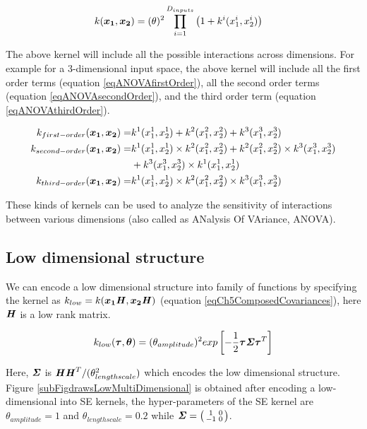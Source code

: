 \begin{align}
k(\boldsymbol{x_{1}}, \boldsymbol{x_{2}}) & = (\theta)^2 \prod_{i=1}^{D_{inputs}} \left(1 + k^{i}(x_{1}^{i}, x_{2}^{i})\right) \label{eqANOVAdecomposition} 
\end{align}

The above kernel will include all the possible interactions across dimensions. For example for a 3-dimensional input space, the above kernel will include all the first order terms (equation \ref{eqANOVAfirstOrder}), all the second order terms (equation \ref{eqANOVAsecondOrder}), and the third order term (equation \ref{eqANOVAthirdOrder}).

\begin{align}
k_{first-order}(\boldsymbol{x_{1}}, \boldsymbol{x_{2}}) =  & k^{1}(x_{1}^{1}, x_{2}^{1}) + k^{2}(x_{1}^{2}, x_{2}^{2}) + k^{3}(x_{1}^{3}, x_{2}^{3})\label{eqANOVAfirstOrder} \\
k_{second-order}(\boldsymbol{x_{1}}, \boldsymbol{x_{2}})  = & k^{1}(x_{1}^{1}, x_{2}^{1}) \times k^{2}(x_{1}^{2}, x_{2}^{2}) + k^{2}(x_{1}^{2}, x_{2}^{2}) \times k^{3}(x_{1}^{3}, x_{2}^{3}) \\ & 
+  k^{3}(x_{1}^{3}, x_{2}^{3}) \times k^{1}(x_{1}^{1}, x_{2}^{1}) \label{eqANOVAsecondOrder} \\
k_{third-order}(\boldsymbol{x_{1}}, \boldsymbol{x_{2}}) = & k^{1}(x_{1}^{1}, x_{2}^{1}) \times k^{2}(x_{1}^{2}, x_{2}^{2}) \times k^{3}(x_{1}^{3}, x_{2}^{3})\label{eqANOVAthirdOrder} \\
\end{align}


These kinds of kernels can be used to analyze the sensitivity of interactions between various dimensions (also called as ANalysis Of VAriance, ANOVA). 

\subsection{Low dimensional structure}
We can encode a low dimensional structure into family of functions by specifying the kernel as $k_{low} = k(\boldsymbol{x_{1}}\bm{\mathit{H}}, \boldsymbol{x_{2}}\bm{\mathit{H}})$ (equation \ref{eqCh5ComposedCovariances}), here $\bm{\mathit{H}}$ is a low rank matrix. 

\begin{align}\label{eq:SELowDimensional}
k_{low}(\boldsymbol{\tau}, \boldsymbol{\theta}) = (\theta_{amplitude})^2  exp\left [  -\frac{1}{2} \boldsymbol{\tau} \bm{\mathit{\Sigma}} \boldsymbol{\tau}^T \right ] 
\end{align}

Here, $\bm{\mathit{\Sigma}}$ is $\bm{\mathit{H}}\bm{\mathit{H}}^T/(\theta_{lengthscale}^2)$ which encodes the low dimensional structure. Figure \ref{subFigdrawsLowMultiDimensional} is obtained after encoding a low-dimensional into SE kernels, the hyper-parameters of the SE kernel are $\theta_{amplitude}=1$ and $\theta_{lengthscale}=0.2$ while $\bm{\mathit{\Sigma}} = \bigl( \begin{smallmatrix} 1 & 0\\ -1 & 0\end{smallmatrix}\bigr)$. 

